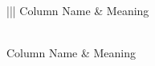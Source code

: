 \documentclass[letterpaper,10pt,english]{sphinxmanual}
\begin{document}
\begin{savenotes}
\sphinxatlongtablestart
\sphinxthistablewithglobalstyle
\begin{longtable}[c]{|||}
\sphinxtoprule
\sphinxstyletheadfamily 
\sphinxAtStartPar
Column Name
&\sphinxstyletheadfamily 
\sphinxAtStartPar
Meaning
\\
\sphinxmidrule
\endfirsthead

\\
\sphinxtoprule
\sphinxstyletheadfamily 
\sphinxAtStartPar
Column Name
&\sphinxstyletheadfamily 
\sphinxAtStartPar
Meaning
\\
\sphinxmidrule
\endhead

\sphinxbottomrule
{}\\
\endfoot

\endlastfoot
\sphinxtableatstartofbodyhook


\end{longtable}
\end{savenotes}
\end{document}

